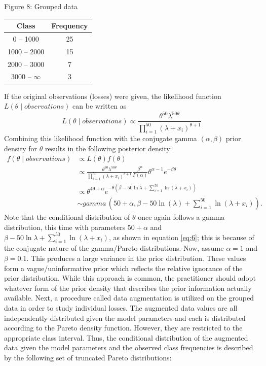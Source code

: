 \documentclass[11pt, oneside]{article}
\newcommand*{\figuretitle}[1]{
    {\centering
    \tiny{#1}
    \par\medskip}
}
\begin{document}
\begin{center}
\figuretitle{Figure 8: Grouped data}
\begin{tabular}{|c|c|}
\hline
Class & Frequency\\
\hline
0 -- 1000&25\\
1000 -- 2000&15\\
2000 -- 3000&7\\
3000 -- $\infty$&3\\
\hline
\end{tabular}
\end{center}
If the original observations (losses) were given, the likelihood function $L(\theta\mid observations)$ can be written as
\[
L(\theta\mid observations) \propto \frac{\theta^{50}\lambda^{50\theta}}{\prod_{i=1}^{50}(\lambda+x_i)^{\theta+1}}
\]
Combining this likelihood function with the conjugate gamma $(\alpha,\beta)$ prior density for $\theta$ results in the following posterior density:
\begin{align}
f(\theta\mid observations) &\propto L(\theta)f(\theta)\nonumber\\
&\propto \frac{\theta^{50}\lambda^{50\theta}}{\prod_{i=1}^{50}(\lambda+x_i)^{\theta+1}}\frac{\beta^{\alpha}}{\Gamma(\alpha)}\theta^{\alpha-1}e^{-\beta\theta}\nonumber\\
&\propto \theta^{49+\alpha}e^{-\theta(\beta-50\ln\lambda+\sum_{i=1}^{50}\ln(\lambda+x_i))}\label{eq:6}\\
&\sim gamma\,(50+\alpha, \beta-50\ln(\lambda)+\sum_{i=1}^{50}\ln(\lambda+x_i)).\nonumber
\end{align}
Note that the conditional distribution of $\theta$ once again follows a gamma distribution, this time with parameters $50+\alpha$ and $\beta-50\ln\lambda+\sum_{i=1}^{50}\ln(\lambda+x_i)$, as shown in equation \ref{eq:6}; this is because of the conjugate nature of the gamma/Pareto distributions. Now, assume $\alpha=1$ and $\beta=0.1$. This produces a large variance in the prior distribution. These values form a vague/uninformative prior which reflects the relative ignorance of the prior distribution. While this approach is common, the practitioner should adopt whatever form of the prior density that describes the prior information actually available. Next, a procedure called data augmentation is utilized on the grouped data in order to study individual losses. The augmented data values are all independently distributed given the model parameters and each is distributed according to the Pareto density function. However, they are restricted to the appropriate class interval. Thus, the conditional distribution of the augmented data given the model parameters and the observed class frequencies is described by the following set of truncated Pareto distributions:
\end{document}
